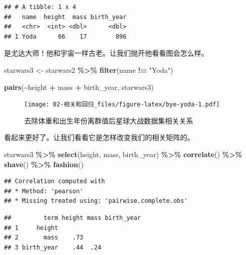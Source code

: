 \documentclass[
]{book}
\newenvironment{Shaded}{\begin{snugshade}}{\end{snugshade}}
\newcommand{\FunctionTok}[1]{\textcolor[rgb]{0.13,0.29,0.53}{\textbf{#1}}}
\newcommand{\NormalTok}[1]{#1}
\newcommand{\OtherTok}[1]{\textcolor[rgb]{0.56,0.35,0.01}{#1}}
\newcommand{\SpecialCharTok}[1]{\textcolor[rgb]{0.81,0.36,0.00}{\textbf{#1}}}
\newcommand{\StringTok}[1]{\textcolor[rgb]{0.31,0.60,0.02}{#1}}
\begin{document}
\begin{verbatim}
## # A tibble: 1 x 4
##   name  height  mass birth_year
##   <chr>  <int> <dbl>      <dbl>
## 1 Yoda      66    17        896
\end{verbatim}

是尤达大师！他和宇宙一样古老。让我们抛开他看看图会怎么样。

\begin{Shaded}
\begin{Highlighting}[]
\NormalTok{starwars3 }\OtherTok{\textless{}{-}}\NormalTok{ starwars2 }\SpecialCharTok{\%\textgreater{}\%}
  \FunctionTok{filter}\NormalTok{(name }\SpecialCharTok{!=} \StringTok{"Yoda"}\NormalTok{)}

\FunctionTok{pairs}\NormalTok{(}\SpecialCharTok{\textasciitilde{}}\NormalTok{height }\SpecialCharTok{+}\NormalTok{ mass }\SpecialCharTok{+}\NormalTok{ birth\_year, starwars3)}
\end{Highlighting}
\end{Shaded}

\begin{figure}
\centering
\texttt{[image: 02-相关和回归\_files/figure-latex/bye-yoda-1.pdf]}
\caption{\label{fig:bye-yoda}去除体重和出生年份离群值后星球大战数据集相关关系}
\end{figure}

看起来更好了。让我们看看它是怎样改变我们的相关矩阵的。

\begin{Shaded}
\begin{Highlighting}[]
\NormalTok{starwars3 }\SpecialCharTok{\%\textgreater{}\%}
  \FunctionTok{select}\NormalTok{(height, mass, birth\_year) }\SpecialCharTok{\%\textgreater{}\%}
  \FunctionTok{correlate}\NormalTok{() }\SpecialCharTok{\%\textgreater{}\%}
  \FunctionTok{shave}\NormalTok{() }\SpecialCharTok{\%\textgreater{}\%}
  \FunctionTok{fashion}\NormalTok{()}
\end{Highlighting}
\end{Shaded}

\begin{verbatim}
## Correlation computed with
## * Method: 'pearson'
## * Missing treated using: 'pairwise.complete.obs'
\end{verbatim}

\begin{verbatim}
##         term height mass birth_year
## 1     height                       
## 2       mass    .73                
## 3 birth_year    .44  .24
\end{verbatim}
\end{document}
